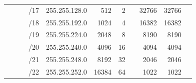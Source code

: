 \documentclass[11pt,a4paper]{article}
\begin{document}
\begin{table}[]
\begin{tabular}{ccccl|r|r|r|r|r|r|}
\multicolumn{1}{c|}{}                                  & \multicolumn{1}{c|}{}                                  & \multicolumn{1}{c|}{}                                  & \multicolumn{1}{c|}{/17} & 255.255.128.0                & 512                          & 2                            &                              & 32766                        & 32766                        &                              \\ \cline{4-11} 
\multicolumn{1}{c|}{}                                  & \multicolumn{1}{c|}{}                                  & \multicolumn{1}{c|}{}                                  & \multicolumn{1}{c|}{/18} & 255.255.192.0                & 1024                         & 4                            &                              & 16382                        & 16382                        &                              \\ \cline{4-11} 
\multicolumn{1}{c|}{}                                  & \multicolumn{1}{c|}{}                                  & \multicolumn{1}{c|}{}                                  & \multicolumn{1}{c|}{/19} & 255.255.224.0                & 2048                         & 8                            &                              & 8190                         & 8190                         &                              \\ \cline{4-11} 
\multicolumn{1}{c|}{}                                  & \multicolumn{1}{c|}{}                                  & \multicolumn{1}{c|}{}                                  & \multicolumn{1}{c|}{/20} & 255.255.240.0                & 4096                         & 16                           &                              & 4094                         & 4094                         &                              \\ \cline{4-11} 
\multicolumn{1}{c|}{}                                  & \multicolumn{1}{c|}{}                                  & \multicolumn{1}{c|}{}                                  & \multicolumn{1}{c|}{/21} & 255.255.248.0                & 8192                         & 32                           &                              & 2046                         & 2046                         &                              \\ \cline{4-11} 
\multicolumn{1}{c|}{}                                  & \multicolumn{1}{c|}{}                                  & \multicolumn{1}{c|}{}                                  & \multicolumn{1}{c|}{/22} & 255.255.252.0                & 16384                        & 64                           &                              & 1022                         & 1022                         &                              \\ \cline{4-11} 

\end{tabular}
\end{table}
\end{document}

